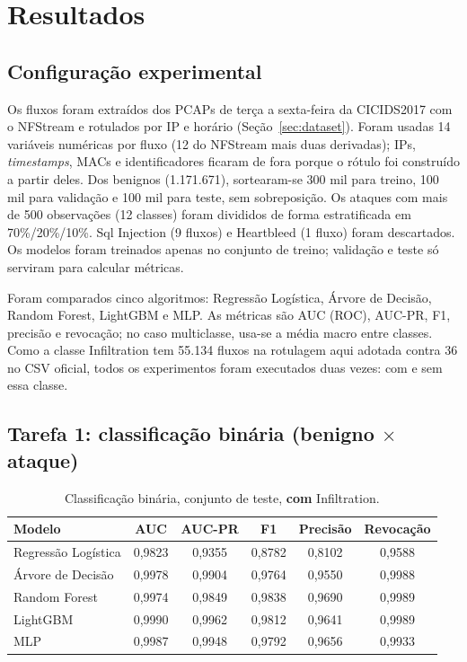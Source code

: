 
\section{Resultados}

\subsection{Configuração experimental}

Os fluxos foram extraídos dos PCAPs de terça a sexta-feira da CICIDS2017 com o NFStream e rotulados por IP e horário (Seção~\ref{sec:dataset}). Foram usadas 14 variáveis numéricas por fluxo (12 do NFStream mais duas derivadas); IPs, \textit{timestamps}, MACs e identificadores ficaram de fora porque o rótulo foi construído a partir deles. Dos benignos (1.171.671), sortearam-se 300 mil para treino, 100 mil para validação e 100 mil para teste, sem sobreposição. Os ataques com mais de 500 observações (12 classes) foram divididos de forma estratificada em 70\%/20\%/10\%. Sql Injection (9 fluxos) e Heartbleed (1 fluxo) foram descartados. Os modelos foram treinados apenas no conjunto de treino; validação e teste só serviram para calcular métricas.

Foram comparados cinco algoritmos: Regressão Logística, Árvore de Decisão, Random Forest, LightGBM e MLP. As métricas são AUC (ROC), AUC-PR, F1, precisão e revocação; no caso multiclasse, usa-se a média macro entre classes. Como a classe Infiltration tem 55.134 fluxos na rotulagem aqui adotada contra 36 no CSV oficial, todos os experimentos foram executados duas vezes: com e sem essa classe.

\subsection{Tarefa 1: classificação binária (benigno $\times$ ataque)}

\begin{table}[ht]
\centering
\caption{Classificação binária, conjunto de teste, \textbf{com} Infiltration.}
\begin{tabular}{lccccc}
\toprule
Modelo & AUC & AUC-PR & F1 & Precisão & Revocação \\
\midrule
Regressão Logística & 0,9823 & 0,9355 & 0,8782 & 0,8102 & 0,9588 \\
Árvore de Decisão   & 0,9978 & 0,9904 & 0,9764 & 0,9550 & 0,9988 \\
Random Forest       & 0,9974 & 0,9849 & 0,9838 & 0,9690 & 0,9989 \\
LightGBM            & 0,9990 & 0,9962 & 0,9812 & 0,9641 & 0,9989 \\
MLP                 & 0,9987 & 0,9948 & 0,9792 & 0,9656 & 0,9933 \\
\bottomrule
\end{tabular}
\end{table}

